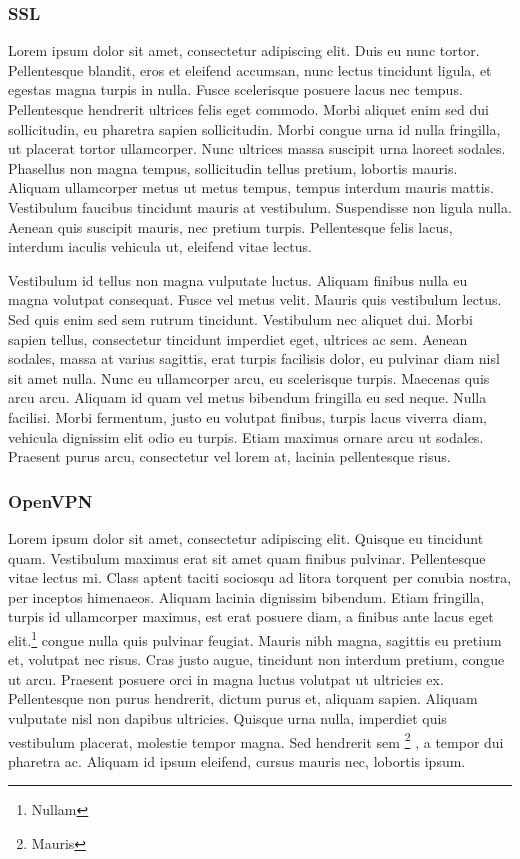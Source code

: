 \documentclass{report}
\begin{document}
\subsubsection{SSL}

Lorem ipsum dolor sit amet, consectetur adipiscing elit. Duis eu nunc tortor. Pellentesque blandit, eros et eleifend accumsan, nunc lectus tincidunt ligula, et egestas magna turpis in nulla. Fusce scelerisque posuere lacus nec tempus. Pellentesque hendrerit ultrices felis eget commodo. Morbi aliquet enim sed dui sollicitudin, eu pharetra sapien sollicitudin. Morbi congue urna id nulla fringilla, ut placerat tortor ullamcorper. Nunc ultrices massa suscipit urna laoreet sodales. Phasellus non magna tempus, sollicitudin tellus pretium, lobortis mauris. Aliquam ullamcorper metus ut metus tempus, tempus interdum mauris mattis. Vestibulum faucibus tincidunt mauris at vestibulum. Suspendisse non ligula nulla. Aenean quis suscipit mauris, nec pretium turpis. Pellentesque felis lacus, interdum iaculis vehicula ut, eleifend vitae lectus.

Vestibulum id tellus non magna vulputate luctus. Aliquam finibus nulla eu magna volutpat consequat. Fusce vel metus velit. Mauris quis vestibulum lectus. Sed quis enim sed sem rutrum tincidunt. Vestibulum nec aliquet dui. Morbi sapien tellus, consectetur tincidunt imperdiet eget, ultrices ac sem. Aenean sodales, massa at varius sagittis, erat turpis facilisis dolor, eu pulvinar diam nisl sit amet nulla. Nunc eu ullamcorper arcu, eu scelerisque turpis. Maecenas quis arcu arcu. Aliquam id quam vel metus bibendum fringilla eu sed neque. Nulla facilisi. Morbi fermentum, justo eu volutpat finibus, turpis lacus viverra diam, vehicula dignissim elit odio eu turpis. Etiam maximus ornare arcu ut sodales. Praesent purus arcu, consectetur vel lorem at, lacinia pellentesque risus.

\subsubsection{OpenVPN}

Lorem ipsum dolor sit amet, consectetur adipiscing elit. Quisque eu tincidunt quam. Vestibulum maximus erat sit amet quam finibus pulvinar. Pellentesque vitae lectus mi. Class aptent taciti sociosqu ad litora torquent per conubia nostra, per inceptos himenaeos. Aliquam lacinia dignissim bibendum. Etiam fringilla, turpis id ullamcorper maximus, est erat posuere diam, a finibus ante lacus eget elit.\footnote{ Nullam} congue nulla quis pulvinar feugiat. Mauris nibh magna, sagittis eu pretium et, volutpat nec risus. Cras justo augue, tincidunt non interdum pretium, congue ut arcu. Praesent posuere orci in magna luctus volutpat ut ultricies ex. Pellentesque non purus hendrerit, dictum purus et, aliquam sapien. Aliquam vulputate nisl non dapibus ultricies. Quisque urna nulla, imperdiet quis vestibulum placerat, molestie tempor magna. Sed hendrerit sem \footnote{Mauris} , a tempor dui pharetra ac. Aliquam id ipsum eleifend, cursus mauris nec, lobortis ipsum.
\end{document}
